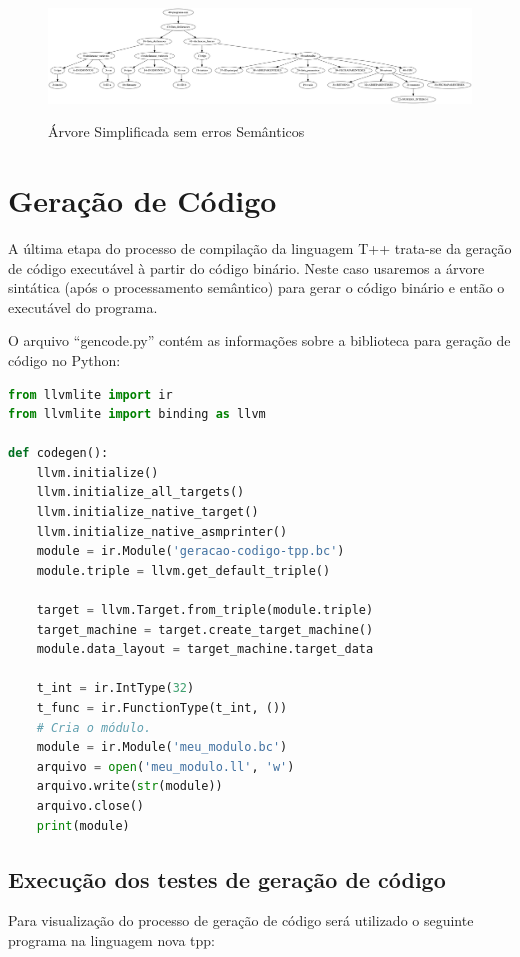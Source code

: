 \documentclass[12pt]{article}
\begin{document}
\begin{figure}[H]  
	\centering  
	\caption{Árvore Simplificada sem erros Semânticos}
	\includegraphics[width=\textwidth]{arvore-sintatica2} 
	\label{fig:arvoresimplificada}
\end{figure}
%  

\section{Geração de Código} 
A última etapa do processo de compilação da linguagem T++ trata-se da geração de código executável à partir do código binário. Neste caso usaremos a árvore sintática (após o processamento semântico) para gerar o código binário e então o executável do programa. 

O arquivo ``gencode.py'' contém as informações sobre a biblioteca para geração de código no Python:   
\begin{lstlisting}[language= Python, caption= Bibliotecas para geração de código em Python, label=cod:coddp] 
from llvmlite import ir   
from llvmlite import binding as llvm    

def codegen():
	llvm.initialize()
	llvm.initialize_all_targets()
	llvm.initialize_native_target()
	llvm.initialize_native_asmprinter()  
	module = ir.Module('geracao-codigo-tpp.bc')  
	module.triple = llvm.get_default_triple()
	
	target = llvm.Target.from_triple(module.triple)
	target_machine = target.create_target_machine() 
	module.data_layout = target_machine.target_data   
	
	t_int = ir.IntType(32) 
	t_func = ir.FunctionType(t_int, ()) 
	# Cria o módulo.
	module = ir.Module('meu_modulo.bc')
	arquivo = open('meu_modulo.ll', 'w')
	arquivo.write(str(module))
	arquivo.close()
	print(module) 
\end{lstlisting} 


\subsection{Execução dos testes de geração de código}  
Para visualização do processo de geração de código será utilizado o seguinte programa na linguagem nova tpp: 
\end{document}
